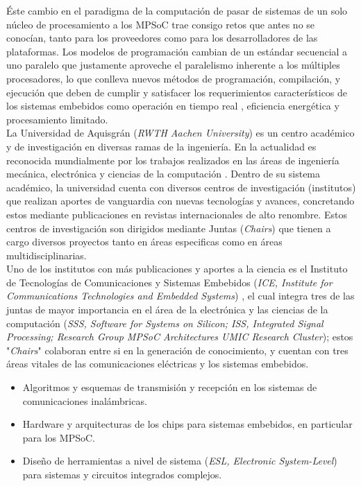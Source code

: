 Éste cambio en el paradigma de la computación de pasar de sistemas de un solo núcleo de procesamiento a los MPSoC trae consigo retos 
que antes no se conocían, tanto para los proveedores como para los desarrolladores de las plataformas. Los modelos de programación cambian 
de un estándar secuencial a uno paralelo que justamente aproveche el paralelismo inherente a los múltiples procesadores,
lo que conlleva nuevos métodos de programación, compilación, y ejecución que deben de cumplir y satisfacer los requerimientos 
característicos de los sistemas embebidos como operación en tiempo real \cite{LERTA_RT}, eficiencia energética y procesamiento limitado.\\

La Universidad de Aquisgrán (\textit{RWTH Aachen University}) es un centro académico y de investigación en diversas
ramas de la ingeniería. En la actualidad es reconocida mundialmente por los trabajos realizados en las áreas de ingeniería mecánica, 
electrónica y ciencias de la computación \cite{RWTH_AACHEN_REF}. Dentro de su sistema académico, la universidad cuenta con diversos centros
de investigación (institutos) que realizan aportes de vanguardia con nuevas tecnologías y avances, concretando estos mediante publicaciones en revistas
internacionales de alto renombre. Estos centros de investigación son dirigidos mediante Juntas (\textit{Chairs}) 
que tienen a cargo diversos proyectos tanto en áreas especificas como en áreas multidisciplinarias.\\

Uno de los institutos con más publicaciones y aportes a la ciencia es el Instituto de Tecnologías de Comunicaciones y 
Sistemas Embebidos (\textit{ICE, Institute for Communications Technologies and Embedded Systems}) \cite{ICE_ABOUT}, 
el cual integra tres de las juntas de mayor importancia en el área de la electrónica y las ciencias 
de la computación (\textit{SSS, Software for Systems on Silicon; ISS, Integrated Signal Processing; Research Group 
MPSoC Architectures UMIC Research Cluster}); estos "\textit{Chairs}" colaboran entre si en la generación de conocimiento, y cuentan con 
tres áreas vitales de las comunicaciones eléctricas y los sistemas embebidos. 

\begin{itemize}
 \item Algoritmos y esquemas de transmisión y recepción en los sistemas de comunicaciones inalámbricas.
 \item Hardware y arquitecturas de los chips para sistemas embebidos, en particular para los MPSoC.
 \item Diseño de herramientas a nivel de sistema (\textit{ESL, Electronic System-Level}) para sistemas y circuitos integrados complejos.
\end{itemize}


